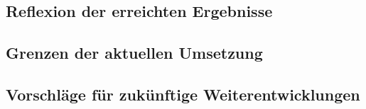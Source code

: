 \documentclass[a4paper, 12pt]{article} %
\begin{document}
\subsection{Reflexion der erreichten Ergebnisse}
\subsection{Grenzen der aktuellen Umsetzung}
\subsection{Vorschläge für zukünftige Weiterentwicklungen}


\clearpage
\begingroup
\renewcommand{\bibfont}{\fontsize{13pt}{12pt}\selectfont}  
\sloppy
\nocite{*}
\printbibliography
\endgroup
\end{document}
